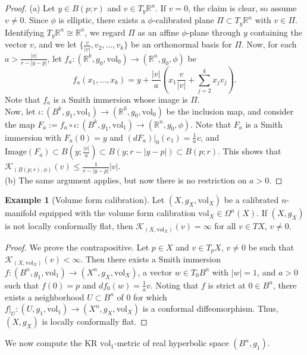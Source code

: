 \documentclass[11pt]{article}
\newcommand{\R}{\mathbb{R}}
\newcommand{\vol}{\mathrm{vol}}
\theoremstyle{definition}
\newtheorem{example}[thm]{Example}
\numberwithin{equation}{section}
\begin{document}
\begin{proof} (a) Let $y \in B(p;r)$ and $v \in T_y\R^n$.  If $v = 0$, the claim is clear, so assume $v \neq 0$.  Since $\phi$ is elliptic, there exists a $\phi$-calibrated plane $\Pi \subset T_y\R^n$ with $v \in \Pi$.  Identifying $T_y\R^n \cong \R^n$, we regard $\Pi$ as an affine $\phi$-plane through $y$ containing the vector $v$, and we let $\{\frac{v}{|v|}, v_2, \ldots, v_k\}$ be an orthonormal basis for $\Pi$.  Now, for each $a > \frac{|v|}{r - |y-p|}$, let $f_a \colon (\R^k, g_0, \vol_0) \to (\R^n, g_0, \phi)$ be
$$f_a(x_1, \ldots, x_k) = y + \frac{|v|}{a}\left( x_1 \frac{v}{|v|} + \sum_{j=2}^k x_j v_j \right)\!.$$
Note that $f_a$ is a Smith immersion whose image is $\Pi$. \\
\indent Now, let $\iota \colon (B^k, g_1, \vol_1) \to (\R^k, g_0, \vol_0)$ be the inclusion map, and consider the map $F_a := f_a \circ \iota \colon (B^k, g_1, \vol_1) \to (\R^n, g_0, \phi)$.  Note that $F_a$ is a Smith immersion with $F_a(0) = y$ and $(dF_a)|_0(e_1) = \frac{1}{a}v$, and $\mathrm{Image}(F_a) \subset B(y; \frac{|v|}{a}) \subset B(y; r - |y-p|) \subset B(p;r)$.  This shows that $\mathcal{K}_{(B(p;r), \phi)}(v) \leq \frac{1}{r-|y-p|}|v|$. \\
\indent (b) The same argument applies, but now there is no restriction on $a > 0$.
\end{proof}

\begin{example}[Volume form calibration] \label{ex:Vol-Form-KR} Let $(X, g_X, \vol_X)$ be a calibrated $n$-manifold equipped with the volume form calibration $\vol_X \in \Omega^n(X)$.  If $(X, g_X)$ is not locally conformally flat, then $\mathcal{K}_{(X, \vol_X)}(v) = \infty$ for all $v \in TX$, $v \neq 0$.
\end{example}

\begin{proof} We prove the contrapositive.  Let $p \in X$ and $v \in T_pX$, $v \neq 0$ be such that $\mathcal{K}_{(X, \vol_X)}(v) < \infty$.  Then there exists a Smith immersion $f \colon (B^n, g_1, \vol_1) \to (X^n, g_X, \vol_X)$, a vector $w \in T_0B^n$ with $|w| = 1$, and $a > 0$ such that $f(0) = p$ and $df_0(w) = \frac{1}{a}v$.  Noting that $f$ is strict at $0 \in B^n$, there exists a neighborhood $U \subset B^n$ of $0$ for which $f|_U \colon (U, g_1, \vol_1) \to (X^n, g_X, \vol_X)$ is a conformal diffeomorphism.  Thus, $(X,g_X)$ is locally conformally flat.
\end{proof}


\indent We now compute the KR $\vol_1$-metric of real hyperbolic space $(B^n, g_1)$.
\end{document}
